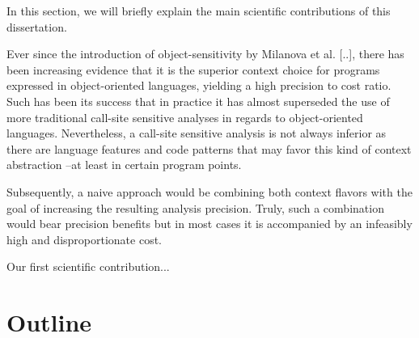 In this section, we will briefly explain the main scientific contributions of this dissertation.

Ever since the introduction of object-sensitivity by Milanova et al. [..], there has been increasing evidence that it is the superior context choice for programs expressed in object-oriented languages, yielding a high precision to cost ratio. Such has been its success that in practice it has almost superseded the use of more traditional call-site sensitive analyses in regards to object-oriented languages. Nevertheless, a call-site sensitive analysis is not always inferior as there are language features and code patterns that may favor this kind of context abstraction --at least in certain program points.

Subsequently, a naive approach would be combining both context flavors with the goal of increasing the resulting analysis precision. Truly, such a combination would bear precision benefits but in most cases it is accompanied by an infeasibly high and disproportionate cost.

Our first scientific contribution...


\section{Outline}

